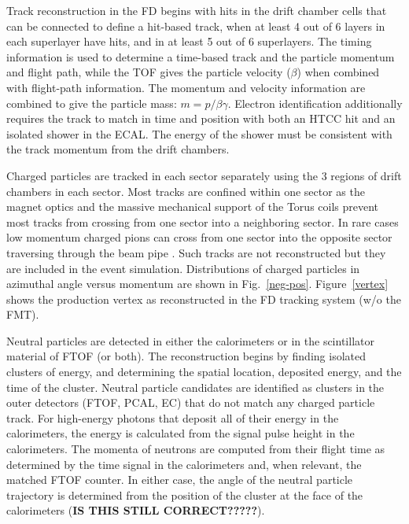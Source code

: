 \documentclass[final,3p,twocolumn]{elsarticle}
\begin{document}
Track reconstruction in the FD begins with hits in the drift chamber cells that can be connected to define a 
hit-based track, when at least 4 out of 6 layers in each superlayer have hits, and in at least 5 out of 6 superlayers. The
timing information is used to determine a time-based track and the particle momentum and flight path, while the TOF
gives the particle velocity ($\beta$) when combined with flight-path information. The momentum and velocity information
are combined to give the particle mass: $m = p/\beta\gamma$. Electron identification additionally requires the track to
match in time and position with both an HTCC hit and an isolated shower in the ECAL. The energy of the shower must be
consistent with the track momentum from the drift chambers.  

Charged particles are tracked in each sector separately using the 3 regions of drift chambers in each sector. Most
tracks are confined within one sector as the magnet optics and the massive mechanical support of the Torus coils
prevent most tracks from crossing from one sector into a neighboring sector. In rare cases low momentum charged
pions can cross from one sector into the opposite sector traversing through the beam pipe . Such tracks are not
reconstructed but they are included in the event simulation. Distributions of charged particles in azimuthal angle
versus momentum are shown in Fig.~\ref{neg-pos}. Figure~\ref{vertex} shows the production vertex as reconstructed
in the FD tracking system (w/o the FMT). 

Neutral particles are detected in either the calorimeters or in the scintillator material of FTOF (or both). The 
reconstruction begins by finding isolated clusters of energy, and determining the spatial location, deposited 
energy, and the time of the cluster. Neutral particle candidates are identified as clusters in the outer detectors 
(FTOF, PCAL, EC) that do not match any charged particle track. For high-energy photons that deposit all of their 
energy in the calorimeters, the energy is calculated from the signal pulse height in the calorimeters. The momenta 
of neutrons are computed from their flight time as determined by the time signal in the calorimeters and, 
when relevant, the matched FTOF counter. In either case, the angle of the neutral particle trajectory is determined
from the position of the cluster at the face of the calorimeters ({\bf IS THIS STILL CORRECT?????}).  
\end{document}
